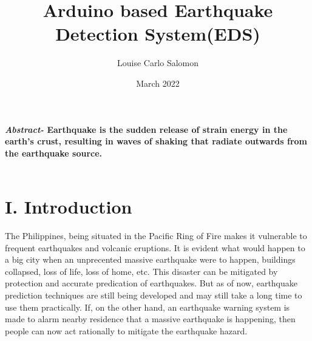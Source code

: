 \documentclass{article}
\title{Arduino based Earthquake Detection System\quad\quad\quad\quad\quad\quad\quad\quad\quad\quad\quad\quad\quad\quad\quad\quad\quad\quad\quad (EDS) }
\author{Louise Carlo Salomon}
\date{March 2022}
\begin{document}
\maketitle
\textbf{\textit{Abstract-} Earthquake is the sudden release of strain energy in the earth's crust, resulting in waves of shaking that radiate outwards from the earthquake source.} 
\\\\





\section*{I. Introduction}
The Philippines, being situated in the Pacific Ring of Fire makes it vulnerable to frequent earthquakes and volcanic eruptions\cite*{ringOfFire}. It is evident what would happen to a big city when an unprecented massive earthquake were to happen, buildings collapsed, loss of life, loss of home, etc. This disaster can be mitigated by protection and accurate predication of earthquakes. But as of now, earthquake prediction techniques are still being developed and may still take a long time to use them practically. If, on the other hand, an earthquake warning system is made to alarm nearby residence that a massive earthquake is happening, then people can now act rationally to mitigate the earthquake hazard. \\
\end{document}
